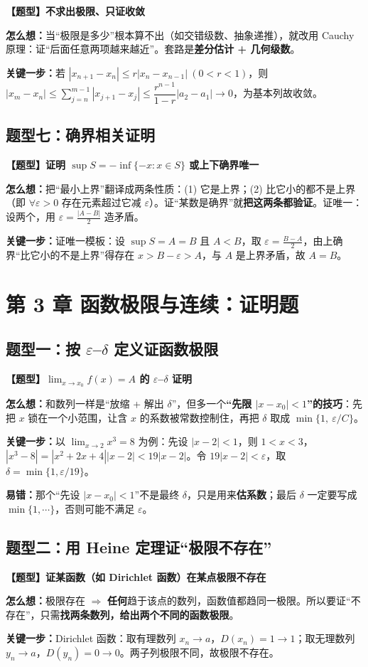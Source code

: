 ﻿\documentclass[11pt,a4paper,UTF8]{ctexart}
\newcommand{\eps}{\varepsilon}
\newcommand{\thm}[1]{\par\smallskip\noindent\colorbox{blue!8}{\textbf{【题型】#1}}\par\smallskip}
\newcommand{\think}[1]{\par\smallskip\noindent\textcolor{purple!75!black}{\textbf{怎么想：}#1}\par\smallskip}
\newcommand{\key}[1]{\par\smallskip\noindent\colorbox{yellow!22}{\textbf{关键一步：}#1}\par\smallskip}
\newcommand{\pit}[1]{\par\smallskip\noindent\textcolor{red!70!black}{\textbf{易错：}#1}\par\smallskip}
\begin{document}
\thm{不求出极限、只证收敛}
\think{当“极限是多少”根本算不出（如交错级数、抽象递推），就改用 Cauchy 原理：证“后面任意两项越来越近”。套路是\textbf{差分估计 + 几何级数}。}
\key{若 $|x_{n+1}-x_n|\le r|x_n-x_{n-1}|\ (0<r<1)$，则 $|x_m-x_n|\le\sum_{j=n}^{m-1}|x_{j+1}-x_j|\le\dfrac{r^{n-1}}{1-r}|a_2-a_1|\to0$，为基本列故收敛。}

\subsection{题型七：确界相关证明}

\thm{证明 $\sup S=-\inf\{-x:x\in S\}$ 或上下确界唯一}
\think{把“最小上界”翻译成两条性质：(1) 它是上界；(2) 比它小的都不是上界（即 $\forall\eps>0$ 存在元素超过它减 $\eps$）。证“某数是确界”就\textbf{把这两条都验证}。证唯一：设两个，用 $\eps=\frac{|A-B|}{2}$ 造矛盾。}
\key{证唯一模板：设 $\sup S=A=B$ 且 $A<B$，取 $\eps=\frac{B-A}2$，由上确界“比它小的不是上界”得存在 $x>B-\eps>A$，与 $A$ 是上界矛盾，故 $A=B$。}

\section{第 3 章 函数极限与连续：证明题}

\subsection{题型一：按 $\eps$–$\delta$ 定义证函数极限}

\thm{$\lim_{x\to x_0}f(x)=A$ 的 $\eps$–$\delta$ 证明}
\think{和数列一样是“放缩 + 解出 $\delta$”，但多一个\textbf{“先限 $|x-x_0|<1$”的技巧}：先把 $x$ 锁在一个小范围，让含 $x$ 的系数被常数控制住，再把 $\delta$ 取成 $\min\{1,\ \eps/C\}$。}
\key{以 $\lim_{x\to2}x^3=8$ 为例：先设 $|x-2|<1$，则 $1<x<3$，$|x^3-8|=|x^2+2x+4||x-2|<19|x-2|$。令 $19|x-2|<\eps$，取 $\delta=\min\{1,\eps/19\}$。}
\pit{那个“先设 $|x-x_0|<1$”不是最终 $\delta$，只是用来\textbf{估系数}；最后 $\delta$ 一定要写成 $\min\{1,\cdots\}$，否则可能不满足 $\eps$。}

\subsection{题型二：用 Heine 定理证“极限不存在”}

\thm{证某函数（如 Dirichlet 函数）在某点极限不存在}
\think{极限存在 $\Rightarrow$ \textbf{任何}趋于该点的数列，函数值都趋同一极限。所以要证“不存在”，只需\textbf{找两条数列，给出两个不同的函数极限}。}
\key{Dirichlet 函数：取有理数列 $x_n\to a$，$D(x_n)=1\to1$；取无理数列 $y_n\to a$，$D(y_n)=0\to0$。两子列极限不同，故极限不存在。}
\end{document}
